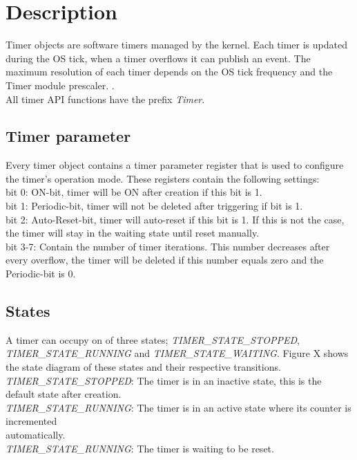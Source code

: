 \section{Description}

Timer objects are software timers managed by the kernel. Each timer is updated during the OS tick, when a timer overflows it can publish an event. The maximum resolution of each timer depends on the OS tick frequency and the Timer module prescaler. . \\
All timer API functions have the prefix \textit{Timer}.

\subsection{Timer parameter}
Every timer object contains a timer parameter register that is used to configure the timer’s operation mode. These registers contain the following settings:\\
bit 0: ON-bit, timer will be ON after creation if this bit is 1.\\
bit 1: Periodic-bit, timer will not be deleted after triggering if bit is 1.\\
bit 2: Auto-Reset-bit, timer will auto-reset if this bit is 1. If this is not the case, the timer will stay in the waiting state until reset manually.\\
bit 3-7: Contain the number of timer iterations. This number decreases after every overflow, the timer will be deleted if this number equals zero and the Periodic-bit is 0. \\

\subsection{States}
A timer can occupy on of three states; \textit{TIMER\_STATE\_STOPPED}, \textit{TIMER\_STATE\_RUNNING} and \textit{TIMER\_STATE\_WAITING}. Figure X shows the state diagram of these states and their respective transitions. \\ 
\textit{TIMER\_STATE\_STOPPED}: The timer is in an inactive state, this is the default state after creation.\\
\textit{TIMER\_STATE\_RUNNING}: The timer is in an active state where its counter is incremented\\ automatically.\\
\textit{TIMER\_STATE\_RUNNING}: The timer is waiting to be reset.\\

